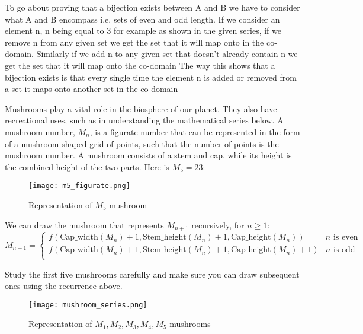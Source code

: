 \documentclass[addpoints]{exam}
\begin{document}
\begin{questions}
  \begin{solution}
    To go about proving that a bijection exists between A and B we have to consider what A and B encompass i.e. sets of even and odd length. If we consider an element n, n being equal to 3 for example as shown in the given series, if we remove n from any given set we get the set that it will map onto in the co-domain. Similarly if we add n to any given set that doesn't already contain n we get the set that it will map onto the co-domain
    \newline \newline
    The way this shows that a bijection exists is that every single time the element n is added or removed from a set it maps onto another set in the co-domain
  \end{solution}
  
\question Mushrooms play a vital role in the biosphere of our planet. They also have recreational uses, such as in understanding the mathematical series below. A mushroom number, $M_n$, is a figurate number that can be represented in the form of a mushroom shaped grid of points, such that the number of points is the mushroom number. A mushroom consists of a stem and cap, while its height is the combined height of the two parts. Here is $M_5=23$:

\begin{figure}[h]
  \centering
  \texttt{[image: m5\_figurate.png]}
  \caption{Representation of $M_5$ mushroom}
  \label{fig:mushroom_anatomy}
\end{figure}

We can draw the mushroom that represents $M_{n+1}$ recursively, for $n \geq 1$:
\[ 
    M_{n+1}=
    \begin{cases} 
      f(\textrm{Cap\_width}(M_n) + 1, \textrm{Stem\_height}(M_n) + 1, \textrm{Cap\_height}(M_n))  & n \textrm{ is even} \\
      f(\textrm{Cap\_width}(M_n) + 1, \textrm{Stem\_height}(M_n) + 1, \textrm{Cap\_height}(M_n)+1) & n \textrm{ is odd}  \\      
   \end{cases}
\]

Study the first five mushrooms carefully and make sure you can draw subsequent ones using the recurrence above.

\begin{figure}[h]
  \centering
  \texttt{[image: mushroom\_series.png]}
  \caption{Representation of $M_1,M_2,M_3,M_4,M_5$ mushrooms}
  \label{fig:mushroom_anatomy}
\end{figure}


\end{questions}
\end{document}
